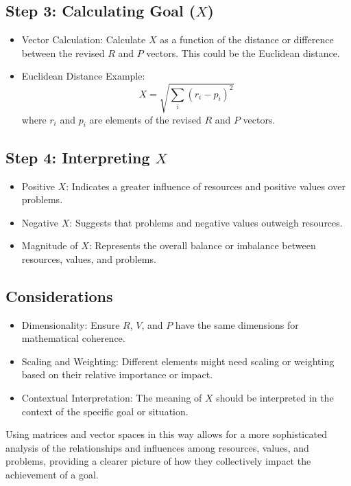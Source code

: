 \documentclass{article}
\begin{document}
\subsection*{Step 3: Calculating Goal (\( X \))}
\begin{itemize}
  \item Vector Calculation: Calculate \( X \) as a function of the distance or difference between the revised \( R \) and \( P \) vectors. This could be the Euclidean distance.
  \item Euclidean Distance Example:
  \[ X = \sqrt{\sum_{i}(r_i - p_i)^2} \]
  where \( r_i \) and \( p_i \) are elements of the revised \( R \) and \( P \) vectors.
\end{itemize}

\subsection*{Step 4: Interpreting \( X \)}
\begin{itemize}
  \item Positive \( X \): Indicates a greater influence of resources and positive values over problems.
  \item Negative \( X \): Suggests that problems and negative values outweigh resources.
  \item Magnitude of \( X \): Represents the overall balance or imbalance between resources, values, and problems.
\end{itemize}

\subsection*{Considerations}
\begin{itemize}
  \item Dimensionality: Ensure \( R \), \( V \), and \( P \) have the same dimensions for mathematical coherence.
  \item Scaling and Weighting: Different elements might need scaling or weighting based on their relative importance or impact.
  \item Contextual Interpretation: The meaning of \( X \) should be interpreted in the context of the specific goal or situation.
\end{itemize}

Using matrices and vector spaces in this way allows for a more sophisticated analysis of the relationships and influences among resources, values, and problems, providing a clearer picture of how they collectively impact the achievement of a goal.
\end{document}
